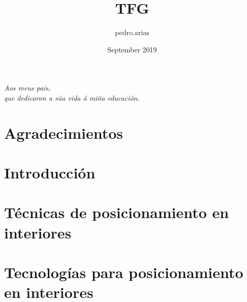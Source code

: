\documentclass[a4paper, 12pt]{memoir} %
\title{TFG}
\author{pedro.arias }
\date{September 2019}
\begin{document}
\renewcommand*\listtablename{Índice de tablas}
\renewcommand\spanishtablename{Tabla}
\renewcommand\theadfont{\bfseries}


\frontmatter


\cleardoublepage

\begin{vplace}[0.7]
    \begin{flushright}
	    \textit{Aos meus pais,\\ que dedicaron a súa vida á miña educación.}
    \end{flushright}
\end{vplace}
\cleardoublepage



\chapter*{Agradecimientos}

\clearpage

\tableofcontents
\clearpage

\listoffigures
\clearpage
\listoftables

\printglossary[type=\acronymtype, title=Acrónimos, toctitle=Acrónimos, style=superheader] %
\cleardoublepage
\printglossary[title=Símbolos, toctitle=Símbolos, style=superheader]
\cleardoublepage

\mainmatter

\chapter{Introducción} \label{chapter:introduccion}

\clearpage

\chapter{Técnicas de posicionamiento en interiores} \label{chapter:tecnicas}


\chapter{Tecnologías para posicionamiento en interiores} \label{chapter:tecnologias}

\clearpage
\end{document}
